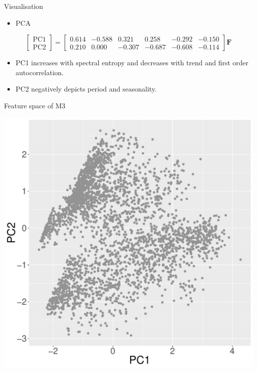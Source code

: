 \documentclass[12pt,ignorenonframetext,compress]{beamer}
\providecommand{\tightlist}{%
\setlength{\itemsep}{0pt}\setlength{\parskip}{0pt}}
\begin{document}
\begin{frame}{Visualisation}

\begin{itemize}
\tightlist
\item
  PCA
\end{itemize}

\[
  \begin{bmatrix}
    \text{PC1} \\
    \text{PC2}
  \end{bmatrix}
  =
  \begin{bmatrix}
    0.614 & -0.588 &  0.321 &  0.258 & -0.292 & -0.150  \\
    0.210 & 0.000 &  -0.307 &  -0.687 & -0.608 &  -0.114
  \end{bmatrix}\textbf{F}
\]

\begin{itemize}
\item
  PC1 increases with spectral entropy and decreases with trend and first
  order autocorrelation.
\item
  PC2 negatively depicts period and seasonality.
\end{itemize}

\end{frame}

\begin{frame}{Feature space of M3}

\centerline{\includegraphics[width=\textwidth]{figures/InstanceSpace0.pdf}}

\end{frame}
\end{document}
